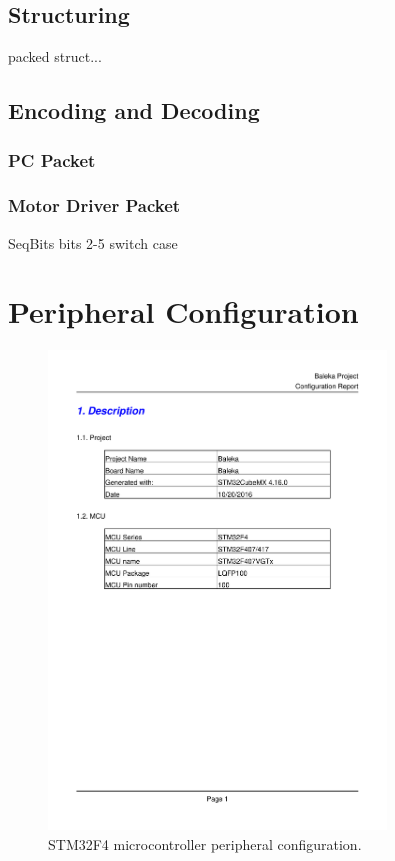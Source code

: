 \subsection{Structuring}
packed struct...

\subsection{Encoding and Decoding}
\subsubsection{PC Packet}
\subsubsection{Motor Driver Packet}
SeqBits bits 2-5 switch case


\section{Peripheral Configuration}

\begin{figure}
\centering
\includegraphics[clip, trim=1cm 7cm 1cm 7cm, page = 2, width=0.8\textwidth]{pdfs/BalekaSTMConfig.pdf} 
\caption{STM32F4 microcontroller peripheral configuration.}
\label{fig:microcontroller-peripheral-config}
\end{figure}

